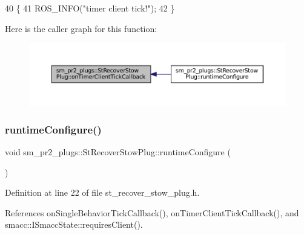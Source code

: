 \begin{DoxyCode}
40     \{
41         ROS\_INFO(\textcolor{stringliteral}{"timer client tick!"});
42     \}
\end{DoxyCode}
Here is the caller graph for this function\+:
\nopagebreak
\begin{figure}[H]
\begin{center}
\leavevmode
\includegraphics[width=350pt]{structsm__pr2__plugs_1_1StRecoverStowPlug_adda940da8f2073a8bcf5ce4d06baccf2_icgraph}
\end{center}
\end{figure}
\mbox{\label{structsm__pr2__plugs_1_1StRecoverStowPlug_a5f2f825961ceda59ed4811aaca86bbcf}} 
\subsubsection{\texorpdfstring{runtime\+Configure()}{runtimeConfigure()}}
{\footnotesize\ttfamily void sm\+\_\+pr2\+\_\+plugs\+::\+St\+Recover\+Stow\+Plug\+::runtime\+Configure (\begin{DoxyParamCaption}{ }\end{DoxyParamCaption})\hspace{0.3cm}{\ttfamily [inline]}}



Definition at line 22 of file st\+\_\+recover\+\_\+stow\+\_\+plug.\+h.



References on\+Single\+Behavior\+Tick\+Callback(), on\+Timer\+Client\+Tick\+Callback(), and smacc\+::\+I\+Smacc\+State\+::requires\+Client().


